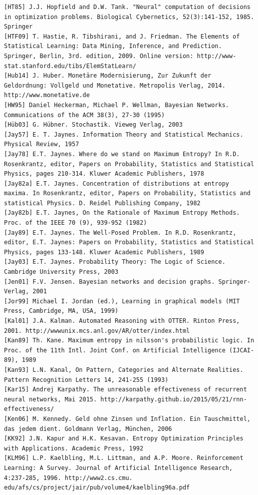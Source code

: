 \documentclass[10pt]{book}
\begin{document}
\begin{center}
\begin{enumerate}
\begin{center}
\begin{center}
\begin{center}
\begin{center}
\begin{center}
\begin{verbatim}
[HT85] J.J. Hopfield and D.W. Tank. "Neural" computation of decisions in optimization problems. Biological Cybernetics, 52(3):141-152, 1985. Springer
[HTF09] T. Hastie, R. Tibshirani, and J. Friedman. The Elements of Statistical Learning: Data Mining, Inference, and Prediction. Springer, Berlin, 3rd. edition, 2009. Online version: http://www-stat.stanford.edu/tibs/ElemStatLearn/
[Hub14] J. Huber. Monetäre Modernisierung, Zur Zukunft der Geldordnung: Vollgeld und Monetative. Metropolis Verlag, 2014. http://www.monetative.de
[HW95] Daniel Heckerman, Michael P. Wellman, Bayesian Networks. Communications of the ACM 38(3), 27-30 (1995)
[Hüb03] G. Hübner. Stochastik. Vieweg Verlag, 2003
[Jay57] E. T. Jaynes. Information Theory and Statistical Mechanics. Physical Review, 1957
[Jay78] E.T. Jaynes. Where do we stand on Maximum Entropy? In R.D. Rosenkrantz, editor, Papers on Probability, Statistics and Statistical Physics, pages 210-314. Kluwer Academic Publishers, 1978
[Jay82a] E.T. Jaynes. Concentration of distributions at entropy maxima. In Rosenkrantz, editor, Papers on Probability, Statistics and statistical Physics. D. Reidel Publishing Company, 1982
[Jay82b] E.T. Jaynes, On the Rationale of Maximum Entropy Methods. Proc. of the IEEE 70 (9), 939-952 (1982)
[Jay89] E.T. Jaynes. The Well-Posed Problem. In R.D. Rosenkrantz, editor, E.T. Jaynes: Papers on Probability, Statistics and Statistical Physics, pages 133-148. Kluwer Academic Publishers, 1989
[Jay03] E.T. Jaynes. Probability Theory: The Logic of Science. Cambridge University Press, 2003
[Jen01] F.V. Jensen. Bayesian networks and decision graphs. Springer-Verlag, 2001
[Jor99] Michael I. Jordan (ed.), Learning in graphical models (MIT Press, Cambridge, MA, USA, 1999)
[Kal01] J.A. Kalman. Automated Reasoning with OTTER. Rinton Press, 2001. http://wwwunix.mcs.anl.gov/AR/otter/index.html
[Kan89] Th. Kane. Maximum entropy in nilsson's probabilistic logic. In Proc. of the 11th Intl. Joint Conf. on Artificial Intelligence (IJCAI-89), 1989
[Kan93] L.N. Kanal, On Pattern, Categories and Alternate Realities. Pattern Recognition Letters 14, 241-255 (1993)
[Kar15] Andrej Karpathy. The unreasonable effectiveness of recurrent neural networks, Mai 2015. http://karpathy.github.io/2015/05/21/rnn-effectiveness/
[Ken06] M. Kennedy. Geld ohne Zinsen und Inflation. Ein Tauschmittel, das jedem dient. Goldmann Verlag, München, 2006
[KK92] J.N. Kapur and H.K. Kesavan. Entropy Optimization Principles with Applications. Academic Press, 1992
[KLM96] L.P. Kaelbling, M.L. Littman, and A.P. Moore. Reinforcement Learning: A Survey. Journal of Artificial Intelligence Research, 4:237-285, 1996. http://www2.cs.cmu. edu/afs/cs/project/jair/pub/volume4/kaelbling96a.pdf

\end{verbatim}
\end{center}
\end{center}
\end{center}
\end{center}
\end{center}
\end{enumerate}
\end{center}
\end{document}
